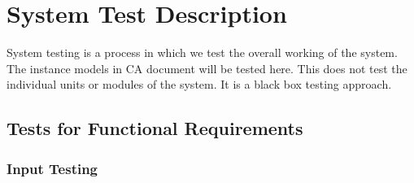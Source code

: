 \documentclass[12pt, titlepage]{article}
\begin{document}
\section{System Test Description}

System testing is a process in which we test the overall working of the system. The instance models in CA document will be tested here. This does not test the individual units or modules of the system. It is a black box testing approach.
	
\subsection{Tests for Functional Requirements}\label{FuncReq}


\subsubsection{Input Testing}\label{InputTesting}

\end{document}
